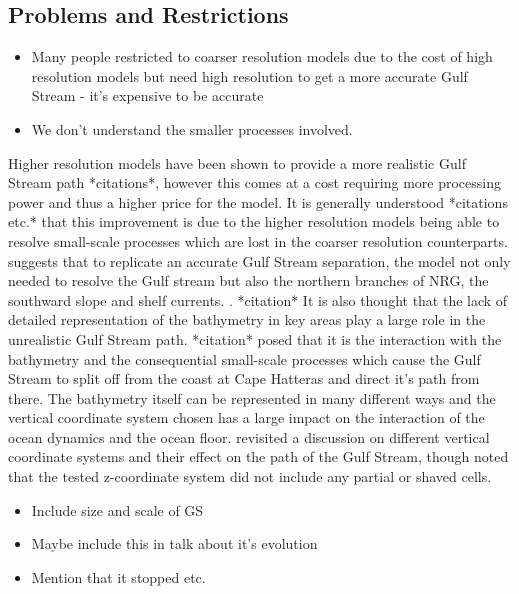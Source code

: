 \documentclass[..\EOYR.tex]{subfiles}
\begin{document}
\subsection{Problems and Restrictions}
\begin{itemize}
  \item Many people restricted to coarser resolution models due to the cost of high resolution models but need high resolution to get a more accurate Gulf Stream - it's expensive to be accurate
  \item We don't understand the smaller processes involved. \citep{Nikurashin2012a}
\end{itemize}
Higher resolution models have been shown to provide a more realistic Gulf Stream path *citations*, however this comes at a cost requiring more processing power and thus a higher price for the model. It is generally understood *citations \citep{Nikurashin2012a} etc.* that this improvement is due to the higher resolution models being able to resolve small-scale processes which are lost in the coarser resolution counterparts. \citep{Ezer2016b} suggests that to replicate an accurate Gulf Stream separation, the model not only needed to resolve the Gulf stream but also the northern branches of NRG, the southward slope and shelf currents. . *citation* It is also thought that the lack of detailed representation of the bathymetry in key areas play a large role in the unrealistic Gulf Stream path. *citation* posed that it is the interaction with the bathymetry and the consequential small-scale processes which cause the Gulf Stream to split off from the coast at Cape Hatteras and direct it’s path from there. The bathymetry itself can be represented in many different ways and the vertical coordinate system chosen has a large impact on the interaction of the ocean dynamics and the ocean floor. \citep{Ezer2016b} revisited a discussion on different vertical coordinate systems and their effect on the path of the Gulf Stream, though noted that the tested z-coordinate system did not include any partial or shaved cells. 

\begin{itemize}
	\item Include size and scale of GS
	\item Maybe include this in talk about it's evolution
	\item Mention that it stopped etc.
\end{itemize}
\end{document}
